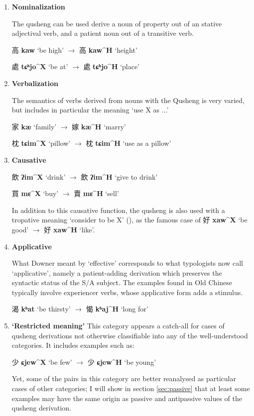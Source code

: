 \documentclass[oneside,a4paper,11pt]{article}
\newcommand{\ipa}[1]{{\phon\textbf{\mbox{#1}}}}
\newcommand{\zh}[1]{{\cn#1}}
\newcommand{\ch}[3]{\zh{#1} \ipa{#2} `#3'}
\begin{document}
\begin{enumerate}
\item \textbf{Nominalization}

The qusheng can be used derive a noun of property out of an stative adjectival verb, and a patient noun out of a transitive verb.

\ch{高}{kaw}{be high} $\rightarrow$ \ch{高}{kaw^H}{height} 

\ch{處}{tɕʰjo^X}{be at} $\rightarrow$ \ch{處}{tɕʰjo^H}{place} 

\item \textbf{Verbalization} 

The semantics of verbs derived from nouns with the Qusheng is very varied, but includes in particular the meaning `use X as ...'

\ch{家}{kæ}{family} $\rightarrow$ \ch{嫁}{kæ^H}{marry} 

\ch{枕}{tɕim^X}{pillow} $\rightarrow$ \ch{枕}{tɕim^H}{use as a pillow} 

\item \textbf{Causative}

\ch{飲}{ʔim^X}{drink} $\rightarrow$ \ch{飲}{ʔim^H}{give to drink} 

\ch{買}{mɛ^X}{buy} $\rightarrow$ \ch{賣}{mɛ^H}{sell} 

In addition to this causative function, the qusheng is also used with a tropative meaning `consider to be X' (\citealt{jacques13tropative}), as the famous case of \ch{好}{xaw^X}{be good} $\rightarrow$ \ch{好}{xaw^H}{like}.

\item \textbf{Applicative} 

What Downer meant by `effective' corresponds to what typologists now call `applicative', namely a patient-adding derivation which preserves the syntactic status of the S/A subject. The examples found in Old Chinese typically involve experiencer verbs, whose applicative form adds a stimulus.

\ch{渴}{kʰat}{be thirsty} $\rightarrow$ \ch{愒}{kʰaj^H}{long for} 

\item \textbf{`Restricted meaning'}
This category appears a catch-all for cases of qusheng derivations not otherwise classifiable into any of the well-understood categories. It includes examples such as:

\ch{少}{ɕjew^X}{be few} $\rightarrow$ \ch{少}{ɕjew^H}{be young} 

Yet, some of the pairs in this category are better reanalysed as particular cases of other categories; I will show in section \ref{sec:passive} that at least some examples may have the same origin as passive and antipassive values of the qusheng derivation.


\end{enumerate}
\end{document}
